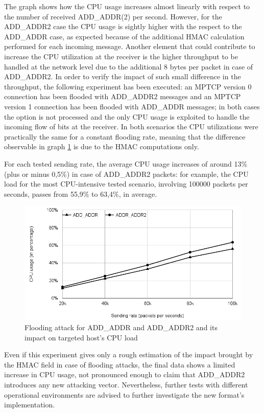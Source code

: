 The graph shows how the CPU usage increases almost linearly with respect to the number of received ADD\_ADDR(2) per second. However, for the ADD\_ADDR2 case the CPU usage is sightly higher with the respect to the ADD\_ADDR case, as expected because of the additional HMAC calculation performed for each incoming message. Another element that could contribute to increase the CPU utilization at the receiver is the higher throughput to be handled at the network level due to the additional 8 bytes per packet in case of ADD\_ADDR2. In order to verify the impact of such small difference in the throughput, the following experiment has been executed: an MPTCP version 0 connection has been flooded with ADD\_ADDR2 messages and an MPTCP version 1 connection has been flooded with ADD\_ADDR messages; in both cases the option is not processed and the only CPU usage is exploited to handle the incoming flow of bits at the receiver. In both scenarios the CPU utilizations were practically the same for a constant flooding rate, meaning that the difference observable in graph \ref{fig:floodgraph} is due to the HMAC computations only.

For each tested sending rate, the average CPU usage increases of around 13\% (plus or minus 0,5\%) in case of ADD\_ADDR2 packets: for example, the CPU load for the most CPU-intensive tested scenario, involving 100000 packets per seconds, passes from 55,9\% to 63,4\%, in average.

\begin{figure}[!htb]
\centering
\includegraphics[width=\textwidth]{images/flood}
\caption{Flooding attack for ADD\_ADDR and ADD\_ADDR2 and its impact on targeted host's CPU load}
\label{fig:floodgraph}
\end{figure} 

Even if this experiment gives only a rough estimation of the impact brought by the HMAC field in case of flooding attacks, the final data shows a limited increase in CPU usage, not pronounced enough to claim that ADD\_ADDR2 introduces any new attacking vector. Nevertheless, further tests with different operational environments are advised to further investigate the new format's implementation.